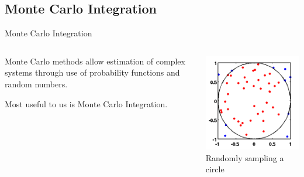 \documentclass[10pt,handout,compress,professionalfont]{beamer}
\begin{document}
\subsection{Monte Carlo Integration}
\begin{frame}{Monte Carlo Integration}


    \begin{columns}
        \begin{column}{0.6\textwidth}

    \vspace{-10mm}
    Monte Carlo methods allow estimation of complex systems through use of probability functions and random numbers.\\
    \vspace{8mm}

    Most useful to us is Monte Carlo Integration.

        \end{column}
        \begin{column}{0.4\textwidth}
            \vspace{-4mm}
            \includegraphics[width=\textwidth]{../img/external/MonteCarloIntegrationCircle}\\
            {\centering\scriptsize Randomly sampling a circle\\}
        \end{column}
    \end{columns}

\end{frame}
\end{document}
